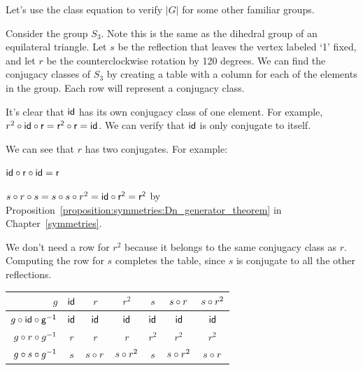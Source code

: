 Let's use the class equation to verify $|G|$ for some other familiar groups.  

\begin{example}\label{example:actions:Conj16}

Consider the group $S_3$.  Note this is the same as the dihedral group of an equilateral triangle.  
Let $s$ be the reflection that leaves the vertex labeled `1' fixed, and let $r$ be the counterclockwise rotation by 120 degrees.  We can find the conjugacy classes of $S_3$ by creating a table with a column for each of the elements in the group.  Each row will represent a conjugacy class.  

It's clear that $\sf{id}$ has its own conjugacy class of one element.  For example, 
$r^2\circ \sf{id} \circ r=r^2\circ r=\sf{id}$. We can verify that $\sf{id}$ is only conjugate to itself.

 We can see that $r$ has two conjugates.  For example:

 $\sf{id}\circ r \circ \sf{id}=r$ 

$s\circ r \circ s=s\circ s\circ r^2=\sf{id}\circ r^2=r^2$
by Proposition~\ref{proposition:symmetries:Dn_generator_theorem}  in Chapter~\ref{symmetries}.  

%


We don't need a row for $r^2$ because it belongs to the same conjugacy class as $r$.  
Computing the row for $s$ completes the table, since $s$ is conjugate to all the other reflections.

\begin{center}
\begin{tabular}{|r | c | c |c | c | c |c |}\hline
$g$ &$\sf{id}$ & $r$ &$r^2$ &$ s$ &$ s\circ r$ & $s\circ r ^2$\\ \hline
$g\circ \sf{id}\circ g^{-1}$ & $\sf{id}$ & $\sf{id}$ & $\sf{id}$ &$\sf{id}$ &$\sf{id}$ &$\sf{id}$ \\ \hline
$ g\circ r\circ g^{-1}$& $r$&$ r$& $r$&$r^2$ &$r^2$ & $r^2$\\ \hline
$g\circ s\circ g^{-1}$ & $s$ &$ s\circ r$ & $s\circ r^2$ & $s$ & $s\circ r^2$ & $s\circ r$\\ \hline 
\end{tabular}
\end{center}


\end{example}
